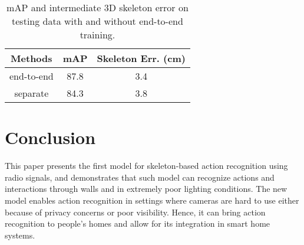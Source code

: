 \documentclass[10pt,twocolumn,letterpaper]{article}
\begin{document}
\begin{table}[htbp]
  \small
    \centering
    \begin{tabular}{ccc}
        \hline
        Methods & mAP & Skeleton Err. (cm) \\
        \hline
        end-to-end & 87.8 & 3.4 \\
        separate & 84.3 & 3.8 \\
        \hline
    \end{tabular}
  \vspace{-10pt}
    \caption{\footnotesize{mAP and intermediate 3D skeleton error on testing data with and without end-to-end training.}}
  \vspace{-5pt}
  \label{tab:ap_e2e}
\end{table}


 \vspace{-10pt}
\section{Conclusion}
This paper presents the first model for skeleton-based action recognition using radio signals, and demonstrates that such model can recognize actions and interactions through walls and in extremely poor lighting conditions. 
The new model enables action recognition in settings where cameras are hard to use either because of privacy concerns or poor visibility.  Hence, it can bring action recognition to people's homes and allow for its integration in smart home systems.  
\clearpage
{\small


}
\end{document}
